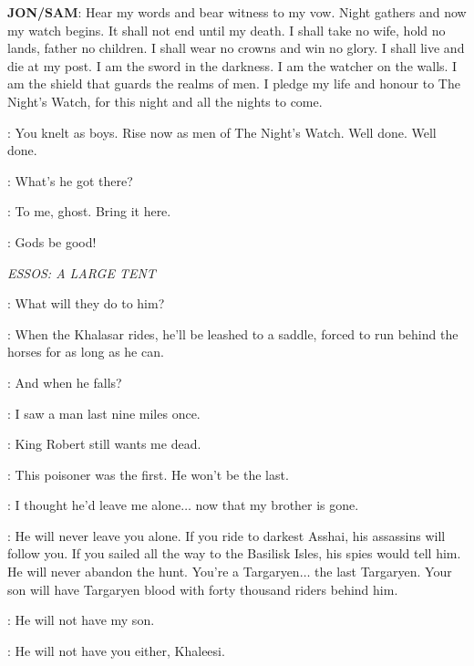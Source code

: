 
\textbf{JON/SAM}: Hear my words and bear witness to my vow. Night gathers and now my watch begins. It shall not end until my death. I shall take no wife, hold no lands, father no children. I shall wear no crowns and win no glory. I shall live and die at my post. I am the sword in the darkness. I am the watcher on the walls. I am the shield that guards the realms of men. I pledge my life and honour to The Night's Watch, for this night and all the nights to come. 

\WATCHMANc: You knelt as boys. Rise now as men of The Night's Watch. Well done. Well done. 


\SAM: What's he got there? 

\JON: To me, ghost. Bring it here. 


\SAM: Gods be good! 


\scene

\textit{ESSOS: A LARGE TENT} 


\DAENERYS: What will they do to him? 

\JORAH: When the Khalasar rides, he'll be leashed to a saddle, forced to run behind the horses for as long as he can. 

\DAENERYS: And when he falls? 

\JORAH: I saw a man last nine miles once. 

\DAENERYS: King Robert still wants me dead. 

\JORAH: This poisoner was the first. He won't be the last. 

\DAENERYS: I thought he'd leave me alone$\ldots$ now that my brother is gone. 

\JORAH: He will never leave you alone. If you ride to darkest Asshai, his assassins will follow you. If you sailed all the way to the Basilisk Isles, his spies would tell him. He will never abandon the hunt. You're a Targaryen$\ldots$ the last Targaryen. Your son will have Targaryen blood with forty thousand riders behind him. 

\DAENERYS: He will not have my son. 

\JORAH: He will not have you either, Khaleesi. 


